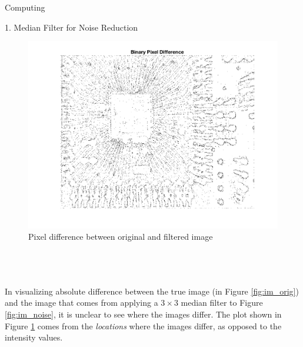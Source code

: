 \begin{section}{Computing}
\begin{homeworkSection}{1. Median Filter for Noise Reduction}
{    \begin{minipage}{0.5\textwidth}
        \begin{figure}[H]
        \centering
        \includegraphics[trim={0cm 1.5cm 1cm 0.5cm},clip,width=1.0\columnwidth]{../data/im_diff_bin}
        \caption{Pixel difference between original and filtered image}
        \label{fig:im_bin}
        \end{figure}
    \end{minipage}
    \\
    \\
    \\
	In visualizing absolute difference between the true image (in Figure \ref{fig:im_orig}) and the image that comes from applying a $3 \times 3$ median filter to Figure \ref{fig:im_noise}, it is unclear to see where the images differ. The plot shown in Figure \ref{fig:im_bin} comes from the \textit{locations} where the images differ, as opposed to the intensity values.
	\\
	\\
}
\end{homeworkSection}


\end{section}

